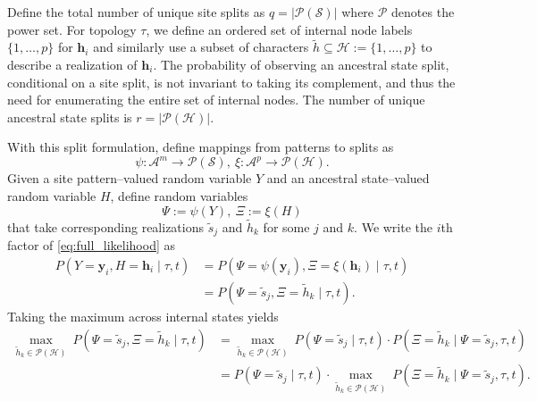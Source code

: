 \documentclass[a4paper]{article}
\newcommand{\alphabet}{\mathcal{A}}
\newcommand{\alignmentColumn}{\mathbf{y}}
\newcommand{\alignmentColumnRV}{Y}
\newcommand{\siteSplit}{\tilde{s}}
\newcommand{\siteSplitSet}{\mathcal{S}}
\newcommand{\ancestralStateColumn}{\mathbf{h}}
\newcommand{\ancestralStateColumnRV}{H}
\newcommand{\ancestralSplit}{\tilde{h}}
\newcommand{\ancestralSplitSet}{\mathcal{H}}
\newcommand{\patternToSplit}{\psi}
\newcommand{\ancestralToSplit}{\xi}
\newcommand{\siteSplitRV}{\Psi}
\newcommand{\ancestralSplitRV}{\Xi}
\newcommand{\nSiteRows}{m}
\newcommand{\nAncestralStateRows}{p}
\newcommand{\nSiteSplits}{q}
\newcommand{\nAncestralSplits}{r}
\begin{document}
Define the total number of unique site splits as $\nSiteSplits=|\mathcal{P}(\siteSplitSet)|$ where $\mathcal{P}$ denotes the power set.
For topology $\tau$, we define an ordered set of internal node labels $\{1,\ldots,\nAncestralStateRows\}$ for $\ancestralStateColumn_i$ and similarly use a subset of characters $\ancestralSplit\subseteq\ancestralSplitSet:=\{1,\ldots,\nAncestralStateRows\}$ to describe a realization of $\ancestralStateColumn_i$.
The probability of observing an ancestral state split, conditional on a site split, is not invariant to taking its complement, and thus the need for enumerating the entire set of internal nodes.
The number of unique ancestral state splits is $\nAncestralSplits=|\mathcal{P}(\ancestralSplitSet)|$.

With this split formulation, define mappings from patterns to splits as
$$
\patternToSplit:\alphabet^\nSiteRows\rightarrow\mathcal{P}(\siteSplitSet), \ \ancestralToSplit:\alphabet^\nAncestralStateRows\rightarrow\mathcal{P}(\ancestralSplitSet).
$$
Given a site pattern--valued random variable $\alignmentColumnRV$ and an ancestral state--valued random variable $\ancestralStateColumnRV$, define random variables
$$
\siteSplitRV := \patternToSplit(\alignmentColumnRV), \ \ancestralSplitRV := \ancestralToSplit(\ancestralStateColumnRV)
$$
that take corresponding realizations $\siteSplit_j$ and $\ancestralSplit_k$ for some $j$ and $k$.
We write the $i$th factor of \eqref{eq:full_likelihood} as
\begin{align*}
    P(\alignmentColumnRV=\alignmentColumn_i, \ancestralStateColumnRV=\ancestralStateColumn_i \mid \tau, t) &= P(\siteSplitRV=\patternToSplit(\alignmentColumn_i), \ancestralSplitRV=\ancestralToSplit(\ancestralStateColumn_i) \mid \tau, t) \\
    &= P(\siteSplitRV=\siteSplit_j, \ancestralSplitRV=\ancestralSplit_k \mid \tau, t).
\end{align*}
Taking the maximum across internal states yields
\begin{align*}
\max_{\ancestralSplit_k\in\mathcal{P}(\ancestralSplitSet)} \ P(\siteSplitRV=\siteSplit_j, \ancestralSplitRV=\ancestralSplit_k \mid \tau, t) &=
\max_{\ancestralSplit_k\in\mathcal{P}(\ancestralSplitSet)} \ P(\siteSplitRV=\siteSplit_j \mid  \tau, t)\cdot P(\ancestralSplitRV=\ancestralSplit_k  \mid \siteSplitRV=\siteSplit_j, \tau, t) \\
&= P(\siteSplitRV=\siteSplit_j \mid  \tau, t)\cdot\max_{\ancestralSplit_k\in\mathcal{P}(\ancestralSplitSet)} \ P(\ancestralSplitRV=\ancestralSplit_k  \mid \siteSplitRV=\siteSplit_j, \tau, t).
\end{align*}
\end{document}
